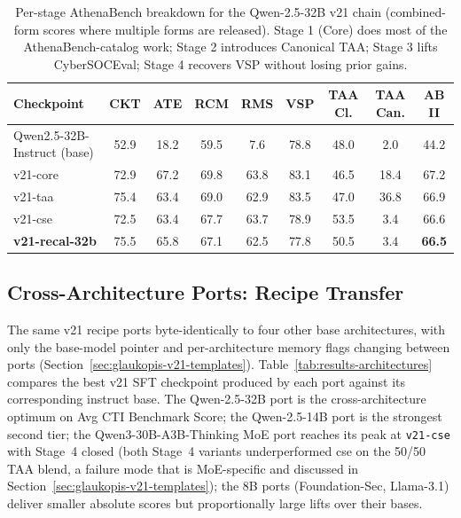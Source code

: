 \documentclass[unnumsec,webpdf,contemporary,large]{oup-authoring-template}
\theoremstyle{thmstyleone}
\theoremstyle{thmstyletwo}
\theoremstyle{thmstylethree}
\begin{document}
\begin{table}[t]
\centering
\caption{Per-stage AthenaBench breakdown for the Qwen-2.5-32B v21 chain (combined-form scores where multiple forms are released). Stage 1 (Core) does most of the AthenaBench-catalog work; Stage 2 introduces Canonical TAA; Stage 3 lifts CyberSOCEval; Stage 4 recovers VSP without losing prior gains.}
\label{tab:results-per-stage}
\small
\begin{tabular}{lcccccccc}
\hline
\textbf{Checkpoint} & \textbf{CKT} & \textbf{ATE} & \textbf{RCM} & \textbf{RMS} & \textbf{VSP} & \textbf{TAA Cl.} & \textbf{TAA Can.} & \textbf{AB II} \\
\hline
Qwen2.5-32B-Instruct (base) & 52.9 & 18.2 & 59.5 & 7.6  & 78.8 & 48.0 & 2.0  & 44.2 \\
v21-core                    & 72.9 & 67.2 & 69.8 & 63.8 & 83.1 & 46.5 & 18.4 & 67.2 \\
v21-taa                     & 75.4 & 63.4 & 69.0 & 62.9 & 83.5 & 47.0 & 36.8 & 66.9 \\
v21-cse                     & 72.5 & 63.4 & 67.7 & 63.7 & 78.9 & 53.5 & 3.4  & 66.6 \\
\textbf{v21-recal-32b}      & 75.5 & 65.8 & 67.1 & 62.5 & 77.8 & 50.5 & 3.4  & \textbf{66.5} \\
\hline
\end{tabular}
\end{table}

\subsection{Cross-Architecture Ports: Recipe Transfer}
\label{sec:results-arch-ports}

The same v21 recipe ports byte-identically to four other base architectures, with only the base-model pointer and per-architecture memory flags changing between ports (Section~\ref{sec:glaukopis-v21-templates}). Table~\ref{tab:results-architectures} compares the best v21 SFT checkpoint produced by each port against its corresponding instruct base. The Qwen-2.5-32B port is the cross-architecture optimum on Avg CTI Benchmark Score; the Qwen-2.5-14B port is the strongest second tier; the Qwen3-30B-A3B-Thinking MoE port reaches its peak at \texttt{v21-cse} with Stage~4 closed (both Stage~4 variants underperformed cse on the 50/50 TAA blend, a failure mode that is MoE-specific and discussed in Section~\ref{sec:glaukopis-v21-templates}); the 8B ports (Foundation-Sec, Llama-3.1) deliver smaller absolute scores but proportionally large lifts over their bases.
\end{document}
